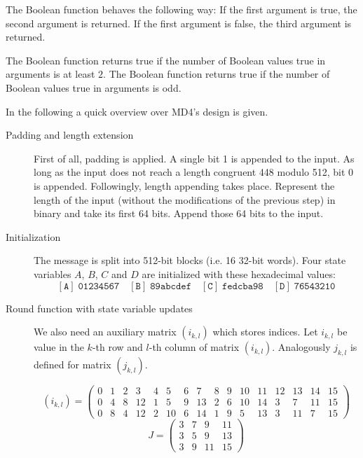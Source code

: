 \begin{defi}
  The Boolean  function behaves the following way:
  If the first argument is true, the second argument is returned.
  If the first argument is false, the third argument is returned.

  The Boolean  function returns true if the number
  of Boolean values true in arguments is at least $2$.
  The Boolean  function returns true if the number
  of Boolean values true in arguments is odd.
\end{defi}

In the following a quick overview over MD4's design is given.

\begin{description}
  \item[Padding and length extension]
    First of all, padding is applied. A single bit 1 is appended to the
    input. As long as the input does not reach a length congruent 448 modulo 512,
    bit 0 is appended.
    Followingly, length appending takes place. Represent the length of the input
    (without the modifications of the previous step) in binary and take its first
    64 bits. Append those 64 bits to the input.
  \item[Initialization]
    The message is split into 512-bit blocks (i.e. 16 32-bit words).
    Four state variables $A$, $B$, $C$ and $D$ are initialized with these
    hexadecimal values:
    \[
      \mathtt{[A]}\; \texttt{01234567} \quad
      \mathtt{[B]}\; \texttt{89abcdef} \quad
      \mathtt{[C]}\; \texttt{fedcba98} \quad
      \mathtt{[D]}\; \texttt{76543210}
    \]
  \item[Round function with state variable updates]
    We also need an auxiliary matrix $(i_{k,l})$ which stores indices.
    Let $i_{k,l}$ be value in the $k$-th row and $l$-th column of matrix $(i_{k,l})$.
    Analogously $j_{k,l}$ is defined for matrix $(j_{k,l})$.

    \[
      (i_{k,l}) = \left(\begin{array}{cccccccccccccccc}
        0 & 1 & 2 & 3 & 4 & 5 & 6 & 7 & 8 & 9 & 10 & 11 & 12 & 13 & 14 & 15 \\
        0 & 4 & 8 & 12 & 1 & 5 & 9 & 13 & 2 & 6 & 10 & 14 & 3 & 7 & 11 & 15 \\
        0 & 8 & 4 & 12 & 2 & 10 & 6 & 14 & 1 & 9 & 5 & 13 & 3 & 11 & 7 & 15
      \end{array}\right)
    \] \[
      J = \begin{pmatrix}
        3 & 7 & 9 & 11 \\
        3 & 5 & 9 & 13 \\
        3 & 9 & 11 & 15
      \end{pmatrix}
    \]


\end{description}
